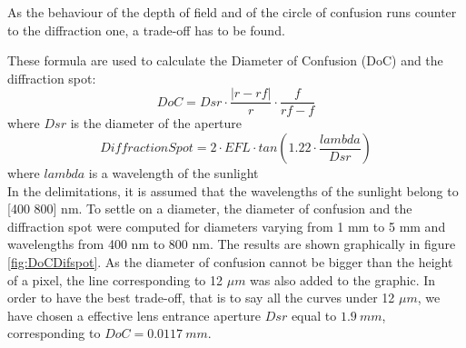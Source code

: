 As the behaviour of the depth of field and of the circle of confusion runs counter to the diffraction one, a trade-off has to be found. 

These formula are used to calculate the Diameter of Confusion (DoC) and the diffraction spot:
\begin{equation*}
DoC = Dsr \cdot \frac{|r-rf|}{r} \cdot \frac{f}{rf - f}
\end{equation*}
where $Dsr$ is the diameter of the aperture
\begin{equation*}
DiffractionSpot = 2 \cdot EFL \cdot tan(1.22 \cdot \frac{lambda}{Dsr})
\end{equation*}
where $lambda$ is a wavelength of the sunlight\\

In the delimitations, it is assumed that the wavelengths of the sunlight belong to [400 800] nm. To settle on a diameter, the diameter of confusion and the diffraction spot were computed for diameters varying from 1 mm to 5 mm and wavelengths from 400 nm to 800 nm. The results are shown graphically in figure \ref{fig:DoCDifspot}. As the diameter of confusion cannot be bigger than the height of a pixel, the line corresponding to 12 $\mu m$ was also added to the graphic. In order to have the best trade-off, that is to say all the curves under 12 $\mu m$, we have chosen a effective lens entrance aperture $Dsr$ equal to $1.9 \ mm$, corresponding to $DoC = 0.0117 \ mm$. 


